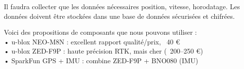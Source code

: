 Il faudra collecter que les données nécessaires position, vitesse, horodatage. Les données doivent être stockées dans une base de données sécurisées et chifrées.

Voici des propositions de composants que nous pouvons utiliser : 	\\
•	u-blox NEO-M8N : excellent rapport qualité/prix, ~40 € \\
•	u-blox ZED-F9P : haute précision RTK, mais cher (~200–250 €) \\
•	SparkFun GPS + IMU : combine ZED-F9P + BNO080 (IMU)\\


